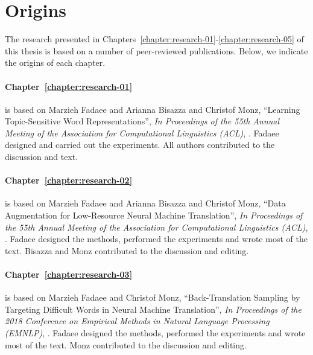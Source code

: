 
\section{Origins}
\label{section:introduction:origins}

The research presented in Chapters~\ref{chapter:research-01}-\ref{chapter:research-05} of this thesis is based on a number of peer-reviewed publications. 
Below, we indicate the origins of each chapter.

\paragraph{Chapter~\ref{chapter:research-01}} is based on Marzieh Fadaee and Arianna Bisazza and Christof Monz,
``Learning Topic-Sensitive Word Representations'',
\textit{In Proceedings of the 55th Annual Meeting of the Association for Computational Linguistics (ACL)},
\citep{fadaee-etal-2017-learning}.
Fadaee designed and carried out the experiments. All authors contributed to the discussion and text.

\paragraph{Chapter~\ref{chapter:research-02}} is based on Marzieh Fadaee and Arianna Bisazza and Christof Monz,
``Data Augmentation for Low-Resource Neural Machine Translation'',
\textit{In Proceedings of the 55th Annual Meeting of the Association for Computational Linguistics (ACL)},
 \citep{fadaee-bisazza-monz:2017:Short2}.
Fadaee designed the methods, performed the experiments and wrote most of the text.
Bisazza and Monz contributed to the discussion and editing.

\paragraph{Chapter~\ref{chapter:research-03}} is based on Marzieh Fadaee and Christof Monz,
``Back-Translation Sampling by Targeting Difficult Words in Neural Machine Translation'',
\textit{In Proceedings of the 2018 Conference on Empirical Methods in Natural Language Processing (EMNLP)},
\citep{fadaee-monz-2018-back}.
Fadaee designed the methods, performed the experiments and wrote most of the text.
Monz contributed to the discussion and editing.

